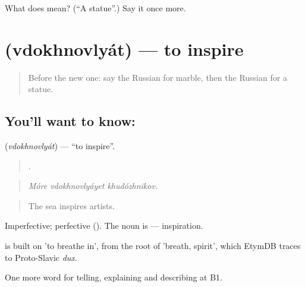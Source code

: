 \begin{tcolorbox}[breakable,colback=teal!4,colframe=teal!35!black,title={Before you move on}]
What does  mean? (\textquotedblleft{}A statue\textquotedblright{}.) Say it once more.
\end{tcolorbox}
\section[\texorpdfstring{\ru{вдохновлять} (vdokhnovlyát)}{вдохновлять (vdokhnovlyát)}]{ (vdokhnovlyát) — to inspire}

\label{lesson:RU-C522-vdokhnovlyat}



\begin{quote}
Before the new one: say the Russian for marble, then the Russian for a statue.
\end{quote}

\subsection*{You'll want to know: }
\textbf{} (\emph{vdokhnovlyát}) — \textquotedblleft{}to inspire\textquotedblright{}.

\begin{quote}
  .
\end{quote}

\begin{quote}
\emph{Móre vdokhnovlyáyet khudózhnikov.}
\end{quote}

\begin{quote}
The sea inspires artists.
\end{quote}

Imperfective; perfective  (). The noun is \emph{} — inspiration.

\begin{cousinweb}
\emph{} is built on \emph{} 'to breathe in', from the root of \emph{} 'breath, spirit', which EtymDB traces to Proto-Slavic \emph{dux}.
\end{cousinweb}

\begin{grammarlens}[title={What you've built}]
One more word for telling, explaining and describing at B1.
\end{grammarlens}

